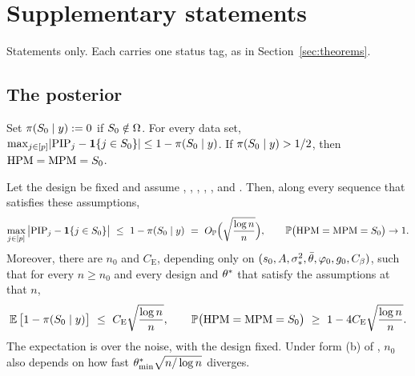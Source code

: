 \section{Supplementary statements}\label{sec:supp}

Statements only. Each carries one status tag, as in Section~\ref{sec:theorems}.

\subsection{The posterior}\label{sec:supp-post}

\begin{supplem}\label{lem:summaries}
Set $\pi(S_0\mid y):=0$ if $S_0\notin\Omega$. For every data set, $\max_{j\in[p]}\lvert \mathrm{PIP}_j-\mathbf{1}\{j\in S_0\}\rvert\le1-\pi(S_0\mid y)$. If $\pi(S_0\mid y)>1/2$, then
$\mathrm{HPM}=\mathrm{MPM}=S_0$.
\end{supplem}


\begin{suppthm}\label{thm:post-fixed}
Let the design be fixed and assume , , , , ,  and . Then, along every
sequence that satisfies these assumptions,
\begin{equation}\label{eq:post-op}
  \max_{j\in\set{p}}\big|\PIP_j-\ind{j\in\Sz}\big|\ \le\ 1-\pis{\Sz}\ =\ \OP\Big(\sqrt{\frac{\log n}{n}}\Big),\qquad
  \P\big(\HPM=\MPM=\Sz\big)\to1 .
\end{equation}
Moreover, there are $n_0$ and $C_{\mathrm E}$, depending only on $(s_0,A,\sigma_*^2,\bar\theta,\varphi_0,g_0,C_\beta)$, such that for
every $n\ge n_0$ and every design and $\theta^*$ that satisfy the assumptions at that $n$,
\begin{equation}\label{eq:post-exp}
  \operatorname{\mathbb{E}}\big[1-\pi(S_0\mid y)\big]\ \le\ C_{\mathrm E}\sqrt{\frac{\log n}{n}},\qquad \mathbb{P}\big(\mathrm{HPM}=\mathrm{MPM}=S_0\big)\ \ge\ 1-4C_{\mathrm E}\sqrt{\frac{\log n}{n}} .
\end{equation}
The expectation is over the noise, with the design fixed. Under form (b) of , $n_0$ also depends on how fast
$\theta^*_{\min}\sqrt{n/\log n}$ diverges.
\end{suppthm}


